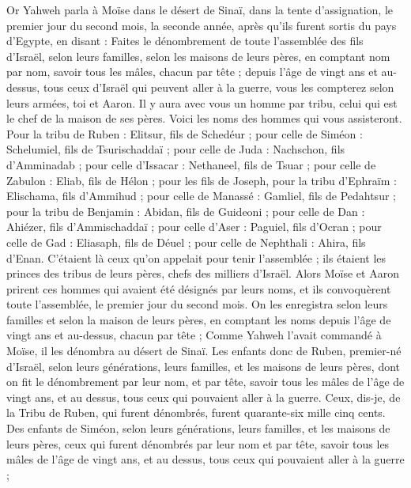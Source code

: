 \begin{multicols}{2}
\VerseOne{}Or Yahweh parla à Moïse dans le désert de Sinaï, dans la tente d'assignation, le premier jour du second mois, la seconde année, après qu'ils furent sortis du pays d'Egypte, en disant :
Faites le dénombrement de toute l'assemblée des fils d'Israël, selon leurs familles, selon les maisons de leurs pères, en comptant nom par nom, savoir tous les mâles, chacun par tête ;
depuis l'âge de vingt ans et au-dessus, tous ceux d'Israël qui peuvent aller à la guerre, vous les compterez selon leurs armées, toi et Aaron.
Il y aura avec vous un homme par tribu, celui qui est le chef de la maison de ses pères.
Voici les noms des hommes qui vous assisteront. Pour la tribu de Ruben : Elitsur, fils de Schedéur ;
pour celle de Siméon : Schelumiel, fils de Tsurischaddaï ;
pour celle de Juda : Nachschon, fils d'Amminadab ;
pour celle d'Issacar : Nethaneel, fils de Tsuar ;
pour celle de Zabulon : Eliab, fils de Hélon ;
pour les fils de Joseph, pour la tribu d'Ephraïm : Elischama, fils d'Ammihud ; pour celle de Manassé : Gamliel, fils de Pedahtsur ;
pour la tribu de Benjamin : Abidan, fils de Guideoni ;
pour celle de Dan : Ahiézer, fils d'Ammischaddaï ;
pour celle d'Aser : Paguiel, fils d'Ocran ;
pour celle de Gad : Eliasaph, fils de Déuel ;
pour celle de Nephthali : Ahira, fils d'Enan.
C'étaient là ceux qu'on appelait pour tenir l'assemblée ; ils étaient les princes des tribus de leurs pères, chefs des milliers d'Israël.
Alors Moïse et Aaron prirent ces hommes qui avaient été désignés par leurs noms,
et ils convoquèrent toute l'assemblée, le premier jour du second mois. On les enregistra selon leurs familles et selon la maison de leurs pères, en comptant les noms depuis l'âge de vingt ans et au-dessus, chacun par tête ;
Comme Yahweh l'avait commandé à Moïse, il les dénombra au désert de Sinaï.
Les enfants donc de Ruben, premier-né d'Israël, selon leurs générations, leurs familles, et les maisons de leurs pères, dont on fit le dénombrement par leur nom, et par tête, savoir tous les mâles de l'âge de vingt ans, et au dessus, tous ceux qui pouvaient aller à la guerre.
Ceux, dis-je, de la Tribu de Ruben, qui furent dénombrés, furent quarante-six mille cinq cents.
Des enfants de Siméon, selon leurs générations, leurs familles, et les maisons de leurs pères, ceux qui furent dénombrés par leur nom et par tête, savoir tous les mâles de l'âge de vingt ans, et au dessus, tous ceux qui pouvaient aller à la guerre ;

\end{multicols}
